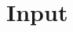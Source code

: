 \documentclass[print,amsmath,amssymb,aps,prc,nofootinbib,notitlepage]{revtex4-1}
\begin{document}







\section{Input}
\end{document}
